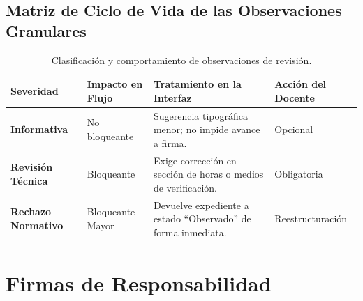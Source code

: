 \documentclass[12pt,a4paper]{article}
\begin{document}
\subsection{Matriz de Ciclo de Vida de las Observaciones Granulares}
\begin{table}[H]
\centering
\small
\renewcommand{\arraystretch}{1.2}
\begin{tabularx}{\textwidth}{|>{\hsize=0.8\hsize\raggedright\arraybackslash\bfseries\footnotesize}X|>{\hsize=0.8\hsize\raggedright\arraybackslash\footnotesize}X|>{\hsize=1.6\hsize\raggedright\arraybackslash\footnotesize}X|>{\hsize=0.8\hsize\centering\arraybackslash\footnotesize}X|}
\hline
\rowcolor{tableheader}
\textbf{Severidad} & \textbf{Impacto en Flujo} & \textbf{Tratamiento en la Interfaz} & \textbf{Acción del Docente} \\
\hline
Informativa & No bloqueante & Sugerencia tipográfica menor; no impide avance a firma. & Opcional \\
\hline
Revisión Técnica & Bloqueante & Exige corrección en sección de horas o medios de verificación. & Obligatoria \\
\hline
Rechazo Normativo & Bloqueante Mayor & Devuelve expediente a estado ``Observado'' de forma inmediata. & Reestructuración \\
\hline
\end{tabularx}
\caption{Clasificación y comportamiento de observaciones de revisión.}
\end{table}

\section{Firmas de Responsabilidad}
\end{document}
